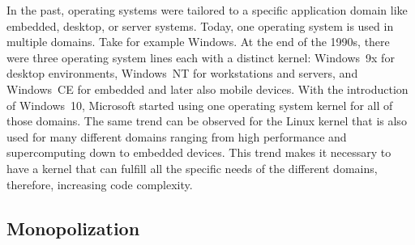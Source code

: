 In the past, operating systems were tailored to a specific application domain like embedded, desktop, or server systems. Today, one operating system is used in multiple domains. Take for example Windows. At the end of the 1990s, there were three operating system lines each with a distinct kernel: Windows~9x for desktop environments, Windows~NT for workstations and servers, and Windows~CE for embedded and later also mobile devices. With the introduction of Windows~10, Microsoft started using one operating system kernel for all of those domains. The same trend can be observed for the Linux kernel that is also used for many different domains ranging from high performance and supercomputing down to embedded devices. This trend makes it necessary to have a kernel that can fulfill all the specific needs of the different domains, therefore, increasing code complexity.

\subsection{Monopolization}%
\label{sec:intro:monopol}

